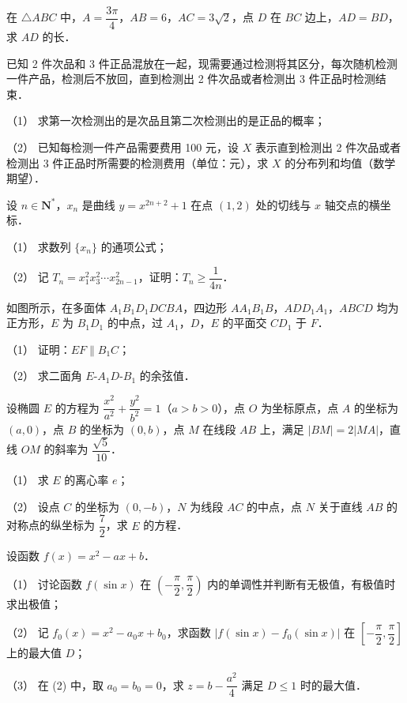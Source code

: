\begin{question}
在 \(\triangle ABC\) 中，\(A=\dfrac{3\pi}{4}\)，\(AB=6\)，\(AC=3\sqrt{2}\)，点 \(D\) 在 \(BC\) 边上，\(AD=BD\)，求 \(AD\) 的长．

\end{question}
\begin{question}
已知 2 件次品和 3 件正品混放在一起，现需要通过检测将其区分，每次随机检测一件产品，检测后不放回，直到检测出 2 件次品或者检测出 3 件正品时检测结束．

（1） 求第一次检测出的是次品且第二次检测出的是正品的概率；

（2） 已知每检测一件产品需要费用 100 元，设 \(X\) 表示直到检测出 2 件次品或者检测出 3 件正品时所需要的检测费用（单位：元），求 \(X\) 的分布列和均值（数学期望）．

\end{question}
\begin{question}
设 \(n\in\mathbf{N}^{*}\)，\(x_n\) 是曲线 \(y=x^{2n+2}+1\) 在点 \((1,2)\) 处的切线与 \(x\) 轴交点的横坐标．

（1） 求数列 \(\{x_n\}\) 的通项公式；

（2） 记 \(T_n=x_1^2x_3^2\cdots x_{2n-1}^2\)，证明：\(T_n\geqslant\dfrac{1}{4n}\)．

\Needspace{0.4\textheight}
\end{question}
\begin{question}
如图所示，在多面体 \(A_1B_1D_1DCBA\)，四边形 \(AA_1B_1B\)，\(ADD_1A_1\)，\(ABCD\) 均为正方形，\(E\) 为 \(B_1D_1\) 的中点，过 \(A_1\)，\(D\)，\(E\) 的平面交 \(CD_1\) 于 \(F\)．
\nopagebreak[4]
\begin{center}\end{center}
\nopagebreak[4]
（1） 证明：\(EF\parallel B_1C\)；

（2） 求二面角 \(E\text{-}A_1D\text{-}B_1\) 的余弦值．

\end{question}
\begin{question}
设椭圆 \(E\) 的方程为 \(\dfrac{x^2}{a^2}+\dfrac{y^2}{b^2}=1\)（\(a>b>0\)），点 \(O\) 为坐标原点，点 \(A\) 的坐标为 \((a,0)\)，点 \(B\) 的坐标为 \((0,b)\)，点 \(M\) 在线段 \(AB\) 上，满足 \(|BM|=2|MA|\)，直线 \(OM\) 的斜率为 \(\dfrac{\sqrt{5}}{10}\)．

（1） 求 \(E\) 的离心率 \(e\)；

（2） 设点 \(C\) 的坐标为 \((0,-b)\)，\(N\) 为线段 \(AC\) 的中点，点 \(N\) 关于直线 \(AB\) 的对称点的纵坐标为 \(\dfrac{7}{2}\)，求 \(E\) 的方程．

\end{question}
\begin{question}
设函数 \(f(x)=x^2-ax+b\)．

（1） 讨论函数 \(f(\sin x)\) 在 \(\left(-\dfrac{\pi}{2},\dfrac{\pi}{2}\right)\) 内的单调性并判断有无极值，有极值时求出极值；

（2） 记 \(f_0(x)=x^2-a_0x+b_0\)，求函数 \(|f(\sin x)-f_0(\sin x)|\) 在 \(\left[-\dfrac{\pi}{2},\dfrac{\pi}{2}\right]\) 上的最大值 \(D\)；

（3） 在 (2) 中，取 \(a_0=b_0=0\)，求 \(z=b-\dfrac{a^2}{4}\) 满足 \(D\leqslant 1\) 时的最大值．

\end{question}